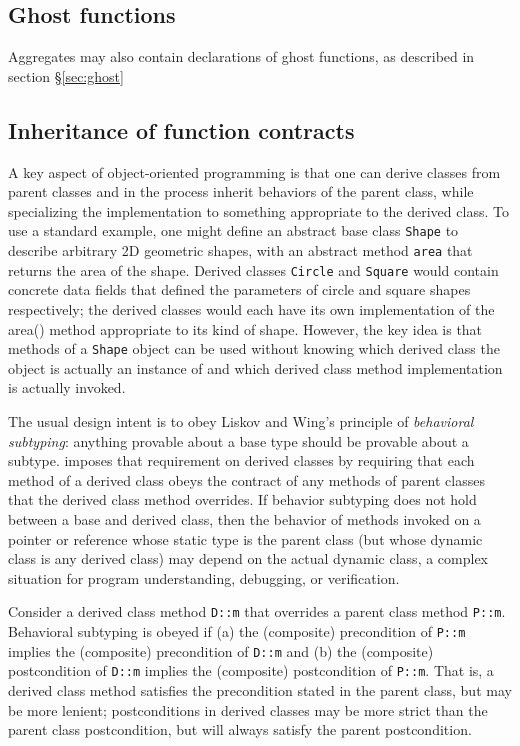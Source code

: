 \subsection{Ghost functions}
Aggregates may also contain declarations of ghost functions, as described in section \S\ref{sec:ghost} 


\subsection{Inheritance of function contracts}

A key aspect of object-oriented programming is 
that one can derive classes from parent classes and in 
the process inherit behaviors of the parent class, 
while specializing the implementation to something appropriate to the derived class. 
To use a standard example, 
one might define an abstract base class \lstinline|Shape| to describe arbitrary 2D geometric shapes, 
with an abstract method 
\lstinline|area| that returns the area of the shape. 
Derived classes \lstinline|Circle| and \lstinline|Square| would contain concrete data fields that defined the parameters of circle and square shapes respectively; 
the derived classes would each have its own implementation of the area() method appropriate to its kind of shape. 
However, the key idea is that methods of a \lstinline|Shape| object can be used without knowing which derived class the object is actually an instance of and
which derived class method implementation is actually invoked.

The usual design intent is to obey Liskov and Wing's principle of \textit{behavioral subtyping}\cite{Liskov:1994:BNS:197320.197383}: 
anything provable about a base type should be provable about a subtype.
\NAME imposes that requirement on derived classes by 
requiring that each method of a derived class obeys the contract of any methods of parent classes that the derived class method overrides. 
If behavior subtyping does not hold between a base and derived class, then the behavior of methods
invoked on a pointer or reference whose static type is the
parent class (but whose dynamic class is any derived class) may depend on the actual dynamic class, 
a complex situation for program understanding, debugging, or verification.

Consider a derived class method \lstinline|D::m| that overrides a parent class method \lstinline|P::m|.
Behavioral subtyping is obeyed if (a) the (composite) precondition of
\lstinline|P::m| implies the (composite) precondition of 
\lstinline|D::m| and (b) the (composite) postcondition of
\lstinline|D::m| implies the (composite) postcondition of 
\lstinline|P::m|. That is, a derived class method satisfies the precondition stated in the parent class, but may be more lenient; 
postconditions in derived classes may be more strict than the parent class postcondition, but will always 
satisfy the parent postcondition. 

